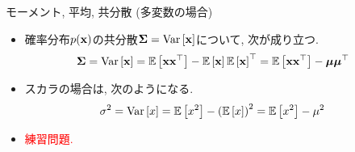 \documentclass[dvipdfmx,notheorems,t]{beamer}
\begin{document}
\begin{frame}{モーメント, 平均, 共分散 (多変数の場合)}
\begin{itemize}
  \item 確率分布$p(\vb{x})$の共分散$\vb{\Sigma} = \Var{\vb{x}}$について, 次が成り立つ.
  \begin{align*}
    \vb{\Sigma} &= \Var{\vb{x}} = \E{\vb{x} \vb{x}^\top} - \E{\vb{x}} \E{\vb{x}}^\top
      = \E{\vb{x} \vb{x}^\top} - \vb*{\mu} \vb*{\mu}^\top
  \end{align*}
  \item スカラの場合は, 次のようになる.
  \begin{align*}
    \sigma^2 &= \Var{x} = \E{x^2} - \left( \E{x} \right)^2 = \E{x^2} - \mu^2
  \end{align*}
  \item \textcolor{red}{練習問題.}
\end{itemize}
\end{frame}
\end{document}
